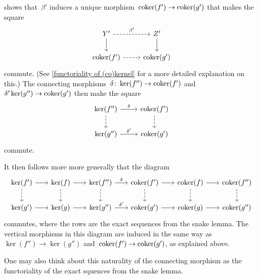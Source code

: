 \begin{remark*}
\begin{enumerate}
\[      \]
      shows that~$\beta'$ induces a unique morphism~$\operatorname{coker}(f') \to \operatorname{coker}(g')$ that makes the square
      \[
        \begin{tikzcd}
            Y'
            \arrow[dashed]{r}[above]{\beta'}
            \arrow{d}
          & Z'
            \arrow{d}
          \\
            \coker(f')
            \arrow[dashed]{r}
          & \coker(g')
        \end{tikzcd}
      \]
      commute.
      (See \cref{functoriality of (co)kernel} for a more detailed explanation on this.)
      The connecting morphisms~$\delta \colon \ker(f'') \to \operatorname{coker}(f')$ and~$\delta' \ker(g'') \to \operatorname{coker}(g')$ then make the square
      \[
        \begin{tikzcd}
            \ker(f'')
            \arrow{r}[above]{\delta}
            \arrow[dashed]{d}
          & \coker(f')
            \arrow[dashed]{d}
          \\
            \ker(g'')
            \arrow{r}[above]{\delta'}
          & \coker(g')
        \end{tikzcd}
      \]
      commute.
      
      It then follows more more generally that the diagram
      \[
        \begin{tikzcd}[column sep = 1.8em]
            \ker(f')
            \arrow{r}
            \arrow[dashed]{d}
          & \ker(f)
            \arrow{r}
            \arrow[dashed]{d}
          & \ker(f'')
            \arrow{r}[above]{\delta}
            \arrow[dashed]{d}
          & \coker(f')
            \arrow{r}
            \arrow[dashed]{d}
          & \coker(f)
            \arrow{r}
            \arrow[dashed]{d}
          & \coker(f'')
            \arrow[dashed]{d}
          \\
            \ker(g')
            \arrow{r}
          & \ker(g)
            \arrow{r}
          & \ker(g'')
            \arrow{r}[above]{\delta'}
          & \coker(g')
            \arrow{r}
          & \coker(g)
            \arrow{r}
          & \coker(g'')
        \end{tikzcd}
      \]
      commutes, where the rows are the exact sequences from the snake lemma.
      The vertical morphisms in this diagram are induced in the same way as~$\ker(f'') \to \ker(g'')$ and~$\operatorname{coker}(f') \to \operatorname{coker}(g')$, as explained above.
      
      One may also think about this naturality of the connecting morphism as the functoriality of the exact squences from the snake lemma.
  \end{enumerate}
\end{remark*}


